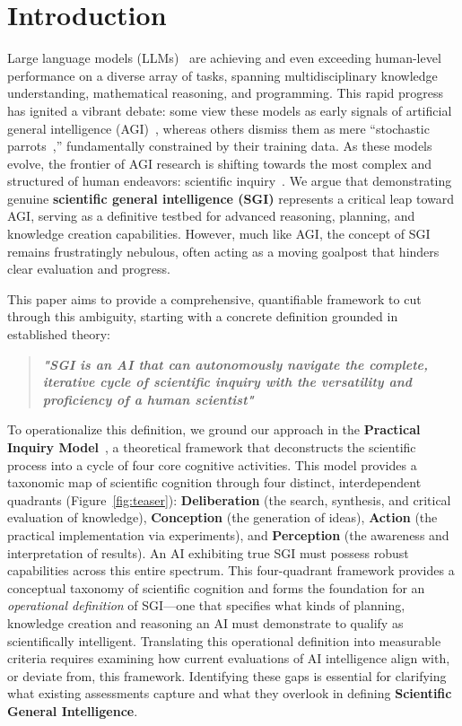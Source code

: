 \section{Introduction}

Large language models (LLMs)~\cite{guo2025deepseek, zhao2023survey, naveed2025comprehensive, hu2025survey, comanici2025gemini} are achieving and even exceeding human-level performance on a diverse array of tasks, spanning multidisciplinary knowledge understanding, mathematical reasoning, and programming. This rapid progress has ignited a vibrant debate: some view these models as early signals of artificial general intelligence (AGI)~\cite{fei2022towards, bubeck2023sparks}, whereas others dismiss them as mere ``stochastic parrots~\cite{bender2021dangers},'' fundamentally constrained by their training data. As these models evolve, the frontier of AGI research is shifting towards the most complex and structured of human endeavors: scientific inquiry~\cite{hu2025surveyscientificlargelanguage}. We argue that demonstrating genuine \textbf{scientific general intelligence (SGI)} represents a critical leap toward AGI, serving as a definitive testbed for advanced reasoning, planning, and knowledge creation capabilities. However, much like AGI, the concept of SGI remains frustratingly nebulous, often acting as a moving goalpost that hinders clear evaluation and progress.

This paper aims to provide a comprehensive, quantifiable framework to cut through this ambiguity, starting with a concrete definition grounded in established theory:
\begin{quote}
\textbf{\emph{"SGI is an AI that can autonomously navigate the complete, iterative cycle of scientific inquiry with the versatility and proficiency of a human scientist"}}
\end{quote}

To operationalize this definition, we ground our approach in the \textbf{Practical Inquiry Model}~\cite{garrison1999critical, garrison2001critical}, a theoretical framework that deconstructs the scientific process into a cycle of four core cognitive activities. This model provides a taxonomic map of scientific cognition through four distinct, interdependent quadrants (Figure~\ref{fig:teaser}): \textbf{Deliberation} (the search, synthesis, and critical evaluation of knowledge), \textbf{Conception} (the generation of ideas), \textbf{Action} (the practical implementation via experiments), and \textbf{Perception} (the awareness and interpretation of results). An AI exhibiting true SGI must possess robust capabilities across this entire spectrum.
This four-quadrant framework provides a conceptual taxonomy of scientific cognition and forms the foundation for an \emph{operational definition} of SGI—one that specifies what kinds of planning, knowledge creation and reasoning an AI must demonstrate to qualify as scientifically intelligent. Translating this operational definition into measurable criteria requires examining how current evaluations of AI intelligence align with, or deviate from, this framework. Identifying these gaps is essential for clarifying what existing assessments capture and what they overlook in defining \textbf{Scientific General Intelligence}.



